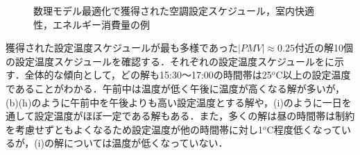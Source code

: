 \begin{figure}[htbp]
  \centering
  \caption{数理モデル最適化で獲得された空調設定スケジュール，室内快適性，エネルギー消費量の例}
  \label{fig::math_result_schedule}
\end{figure}
獲得された設定温度スケジュールが最も多様であった$|PMV| \approx 0.25$付近の解10個の設定温度スケジュールを確認する．それぞれの設定温度スケジュールをに示す．全体的な傾向として，どの解も15:30～17:00の時間帯は25$^o$C以上の設定温度であることがわかる．午前中は温度が低く午後に温度が高くなる解が多いが，(b)(h)のように午前中を午後よりも高い設定温度とする解や，(i)のように一日を通して設定温度がほぼ一定である解もある．また，多くの解は昼の時間帯は制約を考慮せずともよくなるため設定温度が他の時間帯に対し1$^o$C程度低くなっているが，(i)の解については温度が低くなっていない．

